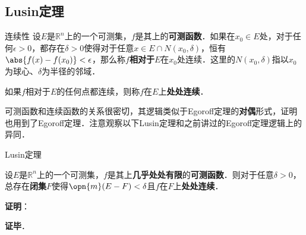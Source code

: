 \subsection{Lusin定理}

\begin{definition}{连续性}
设$E$是$\mathbb{R}^n$上的一个可测集，$f$是其上的\textbf{可测函数}．如果在$x_0\in E$处，对于任何$\epsilon>0$，都存在$\delta>0$使得对于任意$x\in E\cap N(x_0, \delta)$，恒有$\abs{f(x)-f(x_0)}<\epsilon$，那么称$f$\textbf{相对于}$E$在$x_0$处连续．这里的$N(x_0, \delta)$指以$x_0$为球心、$\delta$为半径的邻域．

如果$f$相对于$E$的任何点都连续，则称$f$在$E$上\textbf{处处连续}．
\end{definition}

可测函数和连续函数的关系很密切，其逻辑类似于Egoroff定理的\textbf{对偶}形式，证明也用到了Egoroff定理．注意观察以下Lusin定理和之前讲过的Egoroff定理逻辑上的异同．

\begin{theorem}{Lusin定理}

设$E$是$\mathbb{R}^n$上的一个可测集，$f$是其上\textbf{几乎处处有限}的\textbf{可测函数}．则对于任意$\delta>0$，总存在\textbf{闭集}$F$使得$\opn{m}(E-F)<\delta$且$f$在$F$上\textbf{处处连续}．

\end{theorem}

\textbf{证明}：



\textbf{证毕}．


















